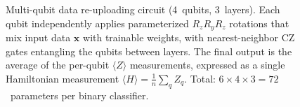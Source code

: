\documentclass[twoside,openany,a4paper,11pt,english]{report}
\begin{document}
\begin{figure}[ht]
\caption{Multi-qubit data re-uploading circuit (4~qubits, 3~layers). Each qubit independently applies parameterized $R_z R_y R_z$ rotations that mix input data $\mathbf{x}$ with trainable weights, with nearest-neighbor CZ gates entangling the qubits between layers. The final output is the average of the per-qubit $\langle Z \rangle$ measurements, expressed as a single Hamiltonian measurement $\langle H \rangle = \tfrac{1}{n}\sum_q Z_q$. Total: $6 \times 4 \times 3 = 72$~parameters per binary classifier.}
\label{fig:reup_multi_circuit}
\end{figure}

\renewcommand{\bibsection}{\chapter{Bibliography}}



\end{document}
